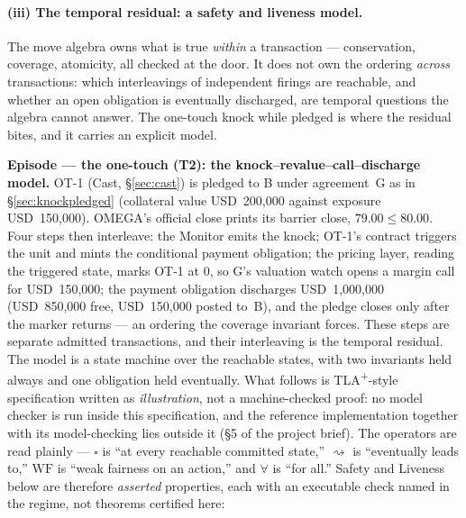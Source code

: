 \documentclass[11pt,a4paper]{article}
\newcommand{\USD}[1]{\mbox{USD~#1}}
\begin{document}
\paragraph{(iii) The temporal residual: a safety and liveness model.}
The move algebra owns what is true \emph{within} a transaction --- conservation, coverage,
atomicity, all checked at the door. It does not own the ordering \emph{across} transactions:
which interleavings of independent firings are reachable, and whether an open obligation is
eventually discharged, are temporal questions the algebra cannot answer. The one-touch knock
while pledged is where the residual bites, and it carries an explicit model.

\medskip\noindent\textbf{Episode --- the one-touch (T2): the knock--revalue--call--discharge
model.}
OT-1 (Cast, \S\ref{sec:cast}) is pledged to B under agreement~G as in
\S\ref{sec:knockpledged} (collateral value \USD{200{,}000} against exposure
\USD{150{,}000}). OMEGA's official close prints its barrier close, $79.00 \le 80.00$. Four steps
then interleave: the Monitor emits the knock; OT-1's contract triggers the unit and mints the
conditional payment obligation; the pricing layer, reading the triggered state, marks OT-1 at
$0$, so G's valuation watch opens a margin call for \USD{150{,}000}; the payment obligation
discharges \USD{1{,}000{,}000} (\USD{850{,}000} free, \USD{150{,}000} posted to~B), and the
pledge closes only after the marker returns --- an ordering the coverage invariant forces.
These steps are separate admitted transactions, and their interleaving is the temporal
residual. The model is a state machine over the reachable states, with two invariants held
always and one obligation held eventually. What follows is TLA\textsuperscript{+}-style
specification written as \emph{illustration}, not a machine-checked proof: no model checker is
run inside this specification, and the reference implementation together with its
model-checking lies outside it (\S 5 of the project brief). The operators are read plainly ---
$\square$ is ``at every reachable committed state,'' $\rightsquigarrow$ is ``eventually leads
to,'' $\textrm{WF}$ is ``weak fairness on an action,'' and $\forall$ is ``for all.'' Safety and
Liveness below are therefore \emph{asserted} properties, each with an executable check named in
the regime, not theorems certified here:
\end{document}
